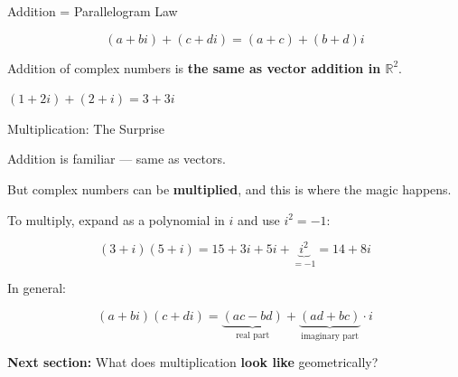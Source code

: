 \documentclass[10pt]{beamer}
\theoremstyle{definition}
\newcommand{\x}[1]{\alert{\textbf{#1}}}
\begin{document}
\begin{frame}{Addition = Parallelogram Law}

$$(a + bi) + (c + di) = (a + c) + (b + d)i$$

\vfill

Addition of complex numbers is \x{the same as vector addition in $\mathbb{R}^2$}.

\vfill

\begin{center}
\end{center}

\vfill

$(1+2i) + (2+i) = 3 + 3i$

\end{frame}


\begin{frame}{Multiplication: The Surprise}

Addition is familiar --- same as vectors.

\vfill

But complex numbers can be \x{multiplied}, and this is where the magic happens.

\vfill\pause

To multiply, expand as a polynomial in $i$ and use $i^2 = -1$:

$$(3 + i)(5 + i) = 15 + 3i + 5i + \underbrace{i^2}_{= -1} = 14 + 8i$$

\vfill\pause

In general:

$$(a + bi)(c + di) = \underbrace{(ac - bd)}_{\text{real part}} + \underbrace{(ad + bc)}_{\text{imaginary part}} \cdot i$$

\vfill

\x{Next section:} What does multiplication \x{look like} geometrically?

\end{frame}
\end{document}
